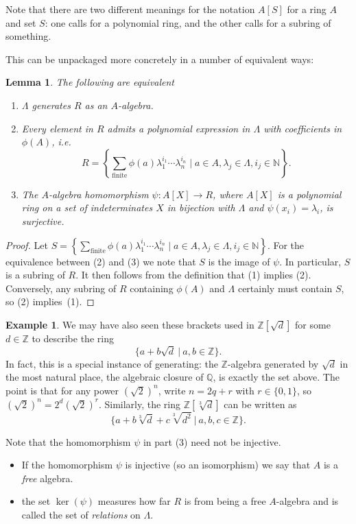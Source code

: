 \documentclass{amsart}[12pt]
\def\ker{\operatorname{ker}}
\newcommand{\Q}{\mathbb{Q}}
\newcommand{\Z}{\mathbb{Z}}
\newcommand{\N}{\mathbb{N}}
\numberwithin{equation}{section}
\theoremstyle{plain} %
\newtheorem{lem}[equation]{Lemma}
\theoremstyle{definition}
\newtheorem{ex}[equation]{Example}
\theoremstyle{remark}
\begin{document}
Note that there are two different meanings for the notation $A[S]$ for a ring $A$ and set $S$: one calls for a polynomial ring, and the other calls for a subring of something.


This can be unpackaged more concretely in a number of equivalent ways:

\begin{lem}
\label{lem:algebragen}
The following are equivalent
\begin{enumerate}
	\item\label{fgalg-1} $\Lambda$ generates $R$ as an $A$-algebra.
	\item\label{fgalg-3} Every element in $R$ admits a polynomial expression in $\Lambda$ with coefficients in $\phi(A)$, i.e.
	\[
	R=\left\{\sum_{\mathrm{finite}} \phi(a) \lambda_1^{i_1} \cdots \lambda_n^{i_n} \mid a\in A, \lambda_j\in\Lambda, i_j\in \N\right\}.
\]
	\item\label{fgalg-4} The $A$-algebra homomorphism $\psi:A[X]\rightarrow R$, where $A[X]$ is a polynomial ring on a set of indeterminates $X$ in bijection with $\Lambda$ and $\psi(x_i)=\lambda_i$, is surjective.
\end{enumerate}
\end{lem}
\begin{proof} Let $S= \left\{\sum_{\mathrm{finite}} \phi(a) \lambda_1^{i_1} \cdots \lambda_n^{i_n} \mid a\in A, \lambda_j\in\Lambda, i_j\in \N\right\}$.
For the equivalence between (2) and (3) we note that $S$ is the image of $\psi$.
In particular, $S$ is a subring of $R$. It then follows from the definition that (1) implies (2). Conversely, any subring of $R$ containing $\phi(A)$ and $\Lambda$ certainly must contain $S$, so (2) implies~(1).
\end{proof}

\begin{ex} We may have also seen these brackets used in $\Z[\sqrt{d}]$ for some $d\in \Z$ to describe the ring 
\[ \{ a + b \sqrt{d} \ | \ a,b\in \Z\}.\]
In fact, this is a special instance of generating: the $\Z$-algebra generated by $\sqrt{d}$ in the most natural place, the algebraic closure of $\Q$, is exactly the set above. The point is that for any power $(\sqrt{2})^n$, write $n=2q+r$ with $r\in \{0,1\}$, so $(\sqrt{2})^n=2^d (\sqrt{2})^r$. Similarly, the ring $\Z[\sqrt[3]{d}]$ can be written as 
\[ \{ a + b \sqrt[3]{d} + c \sqrt[3]{d^2}  \ | \ a,b,c\in \Z\}.\]
\end{ex}


Note that the homomorphism $\psi$ in part (3) need not be injective.
\begin{itemize}
\item If the homomorphism $\psi$ is injective (so an isomorphism) we say that $A$ is a {\em free} algebra.
\item the set $\ker(\psi)$ measures how far $R$ is from being a free $A$-algebra and is called the set of {\em relations} on $\Lambda$.
\end{itemize}
\end{document}
